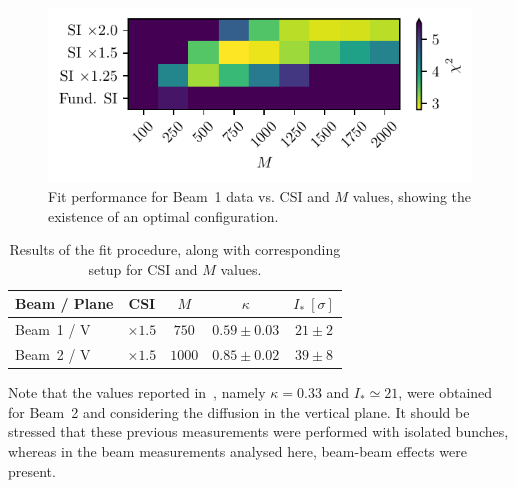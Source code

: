 \begin{figure}
    \centering
    \includegraphics[trim={0 2.5mm 0 1.5mm}, clip, width=0.98\columnwidth]{5_Diffusion_measurement_LHC/figs/fourth.pdf}
    \caption{Fit performance for Beam~1 data vs. CSI and $M$ values, showing the existence of an optimal configuration.}
    \label{fig:fourth}
\end{figure}
%
\begin{table}[htb]
    \centering
    \caption{Results of the fit procedure, along with corresponding setup for CSI and $M$ values.}
    \begin{tabular}{lcccc}
        \toprule
        Beam / Plane & CSI & $M$ & $\kappa$ & $I_\ast\ [\sigma]$ \\
        \midrule
        Beam~1 / V & $\times1.5$ & $750$ & $0.59\pm0.03$ & $21\pm2$ \\
        Beam~2 / V & $\times1.5$ & $1000$ & $0.85\pm0.02$ & $39\pm8$ \\
        \bottomrule
    \end{tabular}
    \label{tab:fit_results}
\end{table}
%

Note that the values reported in~\cite{bazzani2020diffusion}, namely $\kappa=0.33 $ and $I_\ast \simeq 21$, were obtained for Beam~2 and considering the diffusion in the vertical plane. It should be stressed that these previous measurements were performed with isolated bunches, whereas in the beam measurements analysed here, beam-beam effects were present. 

